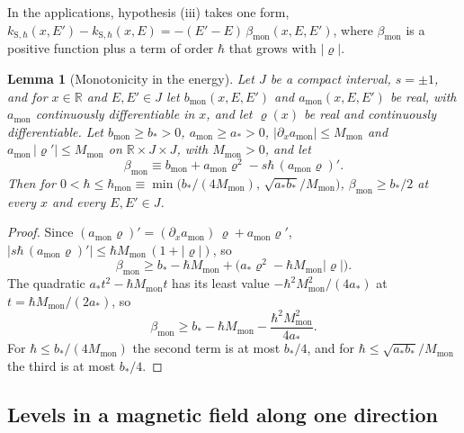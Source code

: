 \documentclass[aps,prd,onecolumn,tightenlines,nofootinbib,notitlepage,11pt,floatfix]{revtex4-2}
\theoremstyle{indentedtheorem}
\newtheorem{lemma}{Lemma}
\begin{document}
In the applications, hypothesis (iii) takes one form, $k_{\text{S},\hbar}(x,E')-k_{\text{S},\hbar}(x,E)=-(E'-E)\,\beta_\text{mon}(x,E,E')$, where $\beta_\text{mon}$ is a positive function plus a term of order $\hbar$ that grows with $|\varrho|$.
\begin{lemma}[Monotonicity in the energy]\label{lem:monotone}
Let $J$ be a compact interval, $s=\pm1$, and for $x\in\mathbb{R}$ and $E,E'\in J$ let $b_\text{mon}(x,E,E')$ and $a_\text{mon}(x,E,E')$ be real, with $a_\text{mon}$ continuously differentiable in $x$, and let $\varrho(x)$ be real and continuously differentiable. Let $b_\text{mon}\geq b_*>0$, $a_\text{mon}\geq a_*>0$, $|\partial_xa_\text{mon}|\leq M_\text{mon}$ and $a_\text{mon}\,|\varrho'|\leq M_\text{mon}$ on $\mathbb{R}\times J\times J$, with $M_\text{mon}>0$, and let
\begin{equation*}
    \beta_\text{mon} \equiv b_\text{mon}+a_\text{mon}\varrho^2-s\hbar\,(a_\text{mon}\varrho)' .
\end{equation*}
Then for $0<\hbar\leq\hbar_\text{mon}\equiv\min\big(b_*/(4M_\text{mon}),\,\sqrt{a_*b_*}/M_\text{mon}\big)$, $\beta_\text{mon}\geq b_*/2$ at every $x$ and every $E,E'\in J$.
\end{lemma}

\begin{proof}
Since $(a_\text{mon}\varrho)'=(\partial_xa_\text{mon})\,\varrho+a_\text{mon}\varrho'$, $|s\hbar\,(a_\text{mon}\varrho)'|\leq\hbar M_\text{mon}\,(1+|\varrho|)$, so
\begin{equation*}
    \beta_\text{mon} \geq b_*-\hbar M_\text{mon}+\big(a_*\varrho^2-\hbar M_\text{mon}|\varrho|\big) .
\end{equation*}
The quadratic $a_*t^2-\hbar M_\text{mon}t$ has its least value $-\hbar^2M_\text{mon}^2/(4a_*)$ at $t=\hbar M_\text{mon}/(2a_*)$, so
\begin{equation*}
    \beta_\text{mon} \geq b_*-\hbar M_\text{mon}-\frac{\hbar^2M_\text{mon}^2}{4a_*} .
\end{equation*}
For $\hbar\leq b_*/(4M_\text{mon})$ the second term is at most $b_*/4$, and for $\hbar\leq\sqrt{a_*b_*}/M_\text{mon}$ the third is at most $b_*/4$.
\end{proof}

\subsection{Levels in a magnetic field along one direction}
\label{sup:proof_levels_B}
\end{document}
